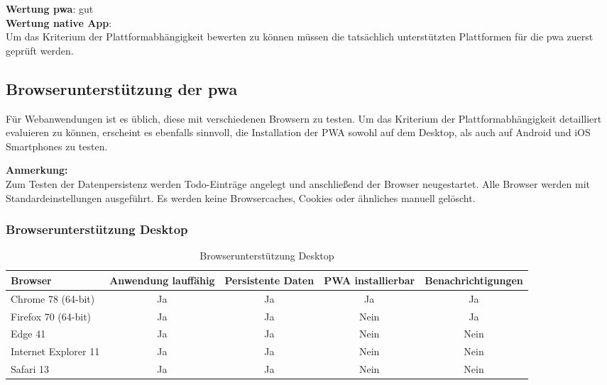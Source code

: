 \textbf{Wertung \ac{pwa}}: gut \\
\textbf{Wertung native App}:  \\

Um das Kriterium der Plattformabhängigkeit bewerten zu können müssen die tatsächlich unterstützten Plattformen für die \ac{pwa} zuerst geprüft werden.

\subsection{Browserunterstützung der \acs{pwa}}
Für Webanwendungen ist es üblich, diese mit verschiedenen Browsern zu testen. Um das Kriterium der Plattformabhängigkeit detailliert evaluieren zu können, erscheint es ebenfalls sinnvoll, die Installation der PWA sowohl auf dem Desktop, als auch auf Android und iOS Smartphones zu testen.

\textbf{Anmerkung:}\\
Zum Testen der Datenpersistenz werden Todo-Einträge angelegt und anschließend der Browser neugestartet.
Alle Browser werden mit Standardeinstellungen ausgeführt. Es werden keine Browsercaches, Cookies oder ähnliches manuell gelöscht.

\subsubsection{Browserunterstützung Desktop}
\begin{table}[H]
	\centering
	\begin{tabularx}{\textwidth}{|l||C|C|C|c|}
		\hline
		Browser              & Anwendung lauffähig & Persistente Daten & PWA installierbar & Benachrichtigungen \\
		\hline
		Chrome 78 (64-bit)   & Ja                  & Ja                & Ja                & Ja                 \\
		Firefox 70 (64-bit)  & Ja                  & Ja                & Nein              & Ja                 \\
		Edge 41    & Ja                  & Ja                & Nein              & Nein               \\
		Internet Explorer 11 & Ja                  & Ja                & Nein              & Nein               \\
		Safari 13            & Ja                  & Ja                & Nein              & Nein               \\
		\hline
	\end{tabularx}
	\caption{Browserunterstützung Desktop} \label{tab:browser_desktop}
\end{table}

